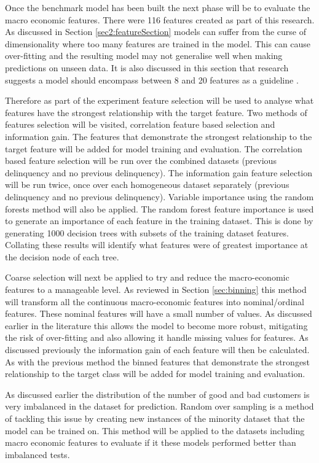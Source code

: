 Once the benchmark model has been built the next phase will be to evaluate the macro economic features. There were 116 features created as part of this research. As discussed in Section \ref{sec2:featureSection} models can suffer from the curse of dimensionality where too many features are trained in the model. This can cause over-fitting and the resulting model may not generalise well when making predictions on unseen data. It is also discussed in this section that research suggests a model should encompass between 8 and 20 features as a guideline \citep{thomas_consumer_2009, mays_credit_2004}.

Therefore as part of the experiment feature selection will be used to analyse what features have the strongest relationship with the target feature. Two methods of features selection will be visited, correlation feature based selection and information gain. The features that demonstrate the strongest relationship to the target feature will be added for model training and evaluation. The correlation based feature selection will be run over the combined datasets (previous delinquency and no previous delinquency). The information gain feature selection will be run twice, once over each homogeneous dataset separately (previous delinquency and no previous delinquency). Variable importance using the random forests method will also be applied. The random forest feature importance is used to generate an importance of each feature in the training dataset. This is done by generating 1000 decision trees with subsets of the training dataset features. Collating these results will identify what features were of greatest importance at the decision node of each tree.

Coarse selection will next be applied to try and reduce the macro-economic features to a manageable level. As reviewed in Section \ref{sec:binning} this method will transform all the continuous macro-economic features into nominal/ordinal features. These nominal features will have a small number of values. As discussed earlier in the literature this allows the model to become more robust, mitigating the risk of over-fitting and also allowing it handle missing values for features. As discussed previously the information gain of each feature will then be calculated. As with the previous method the binned features that demonstrate the strongest relationship to the target class will be added for model training and evaluation. 

As discussed earlier the distribution of the number of good and bad customers is very imbalanced in the dataset for prediction. Random over sampling is a method of tackling this issue by creating new instances of the minority dataset that the model can be trained on. This method will be applied to the datasets including macro economic features to evaluate if it these models performed better than imbalanced tests.


